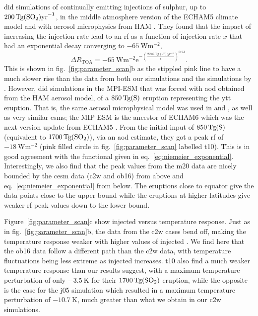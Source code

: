 \documentclass{ametsocV6.1}
\newcommand{\iso}[1][i]{{#1}njected \ce{SO2}}
\begin{document}
\citet{niemeier2015} did simulations of continually emitting injections of sulphur, up
to \(\SI{200}{\tera\gram(\ce{SO2})\mathrm{yr}^{-1}}\), in the middle atmosphere version
of the ECHAM5 \citep{giorgetta2006} climate model and with aerosol microphysics from HAM
\citep{stier2005}. They found that the impact of increasing the injection rate lead to
an \gls{rf} as a function of injection rate \(x\) that had an exponential decay
converging to \(\SI{-65}{\watt\meter^{-2}}\),
\begin{equation}
  \Delta
  R_{\mathrm{TOA}} =
  -\SI{65}{\watt\metre^{-2}}
  \mathrm{e}^{-{\left(\frac{\SI{2246}{\tera\gram(S)yr^{-1}}}{x}\right)}^{0.23}}.
  \label{eq:niemeier_exponential}
\end{equation}
This is shown in fig.~\ref{fig:parameter_scan}b as the stippled pink line to have a much
slower rise than the data from both our simulations and the simulations by
\citet{ottobliesner2016}. However, \citet{timmreck2010} did simulations in the MPI-ESM
that was forced with \gls{aod} obtained from the HAM aerosol model, of a
\(\SI{850}{\tera\gram(\ce{S})}\) eruption representing the \gls{ytt} eruption. That is,
the same aerosol microphysical model was used in \citet{timmreck2010} and
\citet{niemeier2015}, as well as very similar \glspl{esm}; the MIP-ESM is the ancestor
of ECHAM6 which was the next version update from ECHAM5 \citep{kuma2023}. From the
initial input of \(\SI{850}{\tera\gram(\ce{S})}\) (equivalent to
\(\SI{1700}{\tera\gram(\ce{SO2})}\)), via an \gls{aod} estimate, they got a peak
\gls{rf} of \(\SI{-18}{\watt\metre^{-2}}\) (pink filled circle in
fig.~\ref{fig:parameter_scan} labelled \gls{t10}). This is in good agreement with the functional given in
eq.~\ref{eq:niemeier_exponential}. Interestingly, we also find that the peak values from
the \gls{m20} data are nicely bounded by the \gls{cesm} data (\gls{c2w} and \gls{ob16})
from above and eq.~\ref{eq:niemeier_exponential} from below. The eruptions close to
equator give the data points close to the upper bound while the eruptions at higher
latitudes give weaker \gls{rf} peak values down to the lower bound.

Figure~\ref{fig:parameter_scan}c show \iso{} versus temperature response. Just as in
fig.~\ref{fig:parameter_scan}b, the data from the \gls{c2w} cases bend off, making the
temperature response weaker with higher values of \iso{}. We find here that the
\gls{ob16} data follow a different path than the \gls{c2w} data, with temperature
fluctuations being less extreme as \iso{} increases. \gls{t10} also find a much weaker
temperature response than our results suggest, with a maximum temperature perturbation
of only \(\SI{-3.5}{\kelvin}\) for their \(\SI{1700}{\tera\gram(\ce{SO2})}\) eruption,
while the opposite is the case for the \gls{j05} simulation which resulted in a maximum
temperature perturbation of \(\SI{-10.7}{\kelvin}\), much greater than what we obtain in
our \gls{c2w} simulations.
\end{document}
